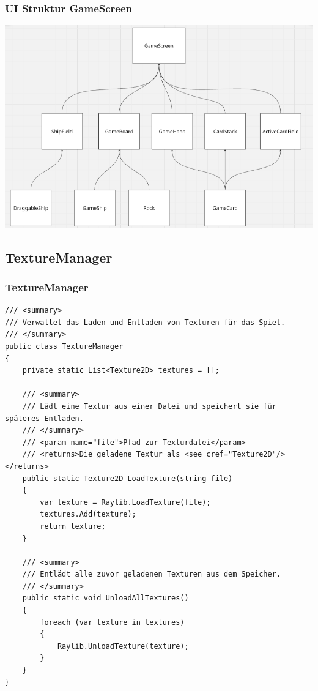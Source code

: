 \documentclass{beamer}
\begin{document}
\begin{frame}
  \frametitle{UI Struktur GameScreen}
  \includegraphics[width=\textwidth]{UI-Struktur.png}
\end{frame}

\subsection{TextureManager}
\begin{frame}[fragile]
\frametitle{TextureManager}
\begin{lstlisting}[language=CSharp, basicstyle=\ttfamily\tiny, breaklines=true]
/// <summary>
/// Verwaltet das Laden und Entladen von Texturen für das Spiel.
/// </summary>
public class TextureManager
{
    private static List<Texture2D> textures = [];

    /// <summary>
    /// Lädt eine Textur aus einer Datei und speichert sie für späteres Entladen.
    /// </summary>
    /// <param name="file">Pfad zur Texturdatei</param>
    /// <returns>Die geladene Textur als <see cref="Texture2D"/></returns>
    public static Texture2D LoadTexture(string file)
    {
        var texture = Raylib.LoadTexture(file);
        textures.Add(texture);
        return texture;
    }

    /// <summary>
    /// Entlädt alle zuvor geladenen Texturen aus dem Speicher.
    /// </summary>
    public static void UnloadAllTextures()
    {
        foreach (var texture in textures)
        {
            Raylib.UnloadTexture(texture);
        }
    }
}
\end{lstlisting}
\end{frame}
\end{document}
